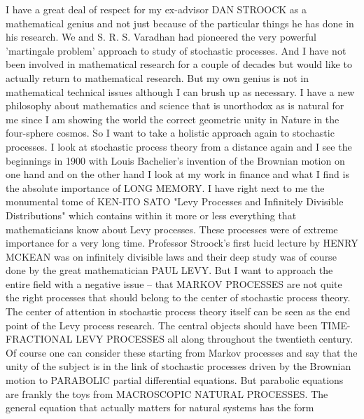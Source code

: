 \documentclass{amsart}
\begin{document}
I have a great deal of respect for my ex-advisor DAN STROOCK as a mathematical genius and not just because of the particular things he has done in his research.  We and S. R. S. Varadhan had pioneered the very powerful 'martingale problem' approach to study of stochastic processes.  And I have not been involved in mathematical research for a couple of decades but would like to actually return to mathematical research.  But my own genius is not in mathematical technical issues although I can brush up as necessary.  I have a new philosophy about mathematics and science that is unorthodox as is natural for me since I am showing the world the correct geometric unity in Nature in the four-sphere cosmos.  So I want to take a holistic approach again to stochastic processes.  I look at stochastic process theory from a distance again and I see the beginnings in 1900 with Louis Bachelier's invention of the Brownian motion on one hand and on the other hand I look at my work in finance and what I find is the absolute importance of LONG MEMORY.  I have right next to me the monumental tome of KEN-ITO SATO "Levy Processes and Infinitely Divisible Distributions" which contains within it more or less everything that mathematicians know about Levy processes.  These processes were of extreme importance for a very long time.  Professor Stroock's first lucid lecture by HENRY MCKEAN was on infinitely divisible laws and their deep study was of course done by the great mathematician PAUL LEVY.  But I want to approach the entire field with a negative issue -- that MARKOV PROCESSES are not quite the right processes that should belong to the center of stochastic process theory.  The center of attention in stochastic process theory itself can be seen as the end point of the Levy process research.  The central objects should have been TIME-FRACTIONAL LEVY PROCESSES all along throughout the twentieth century.  Of course one can consider these starting from Markov processes and say that the unity of the subject is in the link of stochastic processes driven by the Brownian motion to PARABOLIC partial differential equations.  But parabolic equations are frankly the toys from MACROSCOPIC NATURAL PROCESSES.  The general equation that actually matters for natural systems has the form
\end{document}
